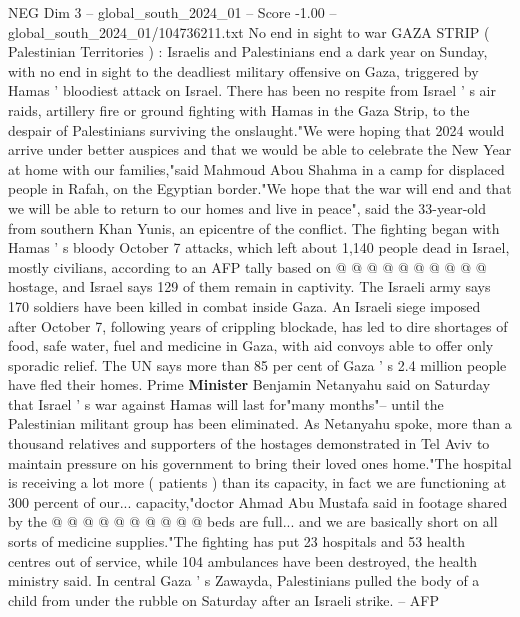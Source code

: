 \begin{textsample}{NEG Dim 3 – global\_south\_2024\_01 – Score -1.00 – global\_south\_2024\_01/104736211.txt}  \label{ex:f3_neg_075}
No end in sight to war GAZA STRIP ( Palestinian Territories ) : Israelis and Palestinians end a dark year on Sunday, with no end in sight to the deadliest military offensive on Gaza, triggered by Hamas ' bloodiest attack on Israel.
There has been no respite from Israel ' s air raids, artillery fire or ground fighting with Hamas in the Gaza Strip, to the despair of Palestinians surviving the onslaught."We were hoping that 2024 would arrive under better auspices and that we would be able to celebrate the New Year at home with our families,"said Mahmoud Abou Shahma in a camp for displaced people in Rafah, on the Egyptian border."We hope that the war will end and that we will be able to return to our homes and live in peace", said the 33-year-old from southern Khan Yunis, an epicentre of the conflict.
The fighting began with Hamas ' s bloody October 7 attacks, which left about 1,140 people dead in Israel, mostly civilians, according to an AFP tally based on @ @ @ @ @ @ @ @ @ @ hostage, and Israel says 129 of them remain in captivity.
The Israeli army says 170 soldiers have been killed in combat inside Gaza.
An Israeli siege imposed after October 7, following years of crippling blockade, has led to dire shortages of food, safe water, fuel and medicine in Gaza, with aid convoys able to offer only sporadic relief.
The UN says more than 85 per cent of Gaza ' s 2.4 million people have fled their homes.
Prime \textbf{Minister} Benjamin Netanyahu said on Saturday that Israel ' s war against Hamas will last for"many months"-- until the Palestinian militant group has been eliminated.
As Netanyahu spoke, more than a thousand relatives and supporters of the hostages demonstrated in Tel Aviv to maintain pressure on his government to bring their loved ones home."The hospital is receiving a lot more ( patients ) than its capacity, in fact we are functioning at 300 percent of our... capacity,"doctor Ahmad Abu Mustafa said in footage shared by the @ @ @ @ @ @ @ @ @ @ beds are full... and we are basically short on all sorts of medicine supplies."The fighting has put 23 hospitals and 53 health centres out of service, while 104 ambulances have been destroyed, the health ministry said.
In central Gaza ' s Zawayda, Palestinians pulled the body of a child from under the rubble on Saturday after an Israeli strike. -- AFP

\end{textsample}
